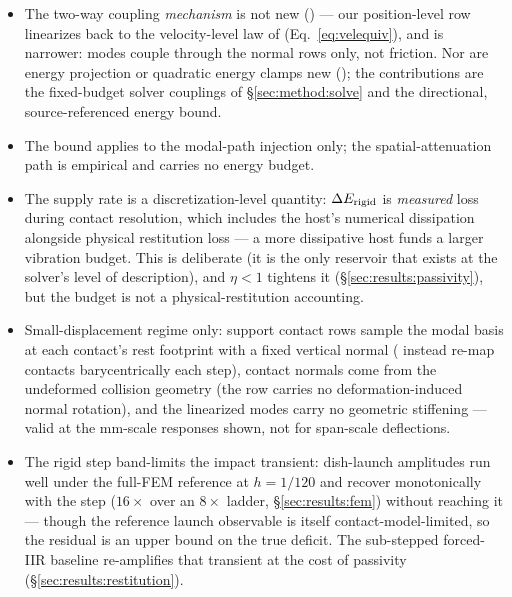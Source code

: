 \begin{itemize}
  \item The two-way coupling \emph{mechanism} is not new
        (\citealp{zheng2011,hauser2003,barbic2008haptic,sheth2015}) --- our
        position-level row linearizes back to the velocity-level law of
        \citet{zheng2011} (Eq.~\ref{eq:velequiv}), and is narrower: modes
        couple through the normal rows only, not friction. Nor are energy
        projection or quadratic energy clamps new
        (\citealp{su2009energy,dinev2018fepr}); the contributions are the
        fixed-budget solver couplings of \S\ref{sec:method:solve} and the
        directional, source-referenced energy bound.
  \item The bound applies to the modal-path injection only; the
        spatial-attenuation path is empirical and carries no energy budget.
  \item The supply rate is a discretization-level quantity: $\Delta E_{\mathrm{rigid}}$ is
        \emph{measured} loss during contact resolution, which includes the
        host's numerical dissipation alongside physical restitution loss ---
        a more dissipative host funds a larger vibration budget. This is
        deliberate (it is the only reservoir that exists at the solver's
        level of description), and $\eta<1$ tightens it
        (\S\ref{sec:results:passivity}), but the budget is not a
        physical-restitution accounting.
  \item Small-displacement regime only: support contact rows sample the modal
        basis at each contact's rest footprint with a fixed vertical normal
        (\citealp{coevoet2020distant} instead re-map contacts barycentrically
        each step), contact
        normals come from the undeformed collision geometry (the row carries
        no deformation-induced normal rotation), and the linearized modes
        carry no geometric stiffening --- valid at the mm-scale responses
        shown, not for span-scale deflections.
  \item The rigid step band-limits the impact transient: dish-launch
        amplitudes run well under the full-FEM reference at $h=1/120$ and
        recover monotonically with the step ($16\times$ over an $8\times$
        ladder, \S\ref{sec:results:fem}) without reaching it --- though the
        reference launch observable is itself contact-model-limited, so the
        residual is an upper bound on the true deficit. The sub-stepped
        forced-IIR baseline re-amplifies that transient at the cost of passivity
        (\S\ref{sec:results:restitution}).

\end{itemize}
